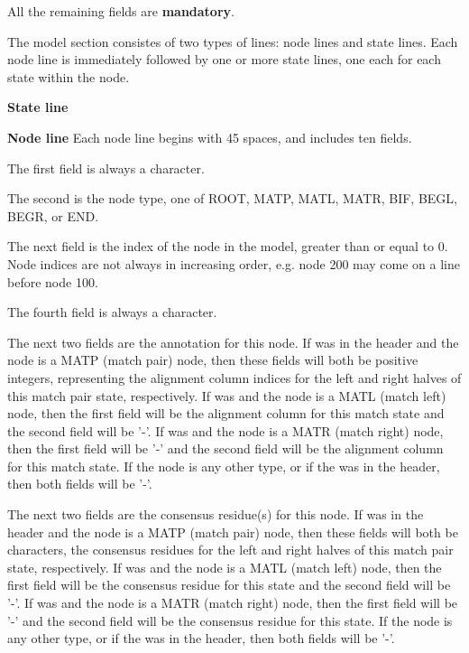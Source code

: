 All the remaining fields are \textbf{mandatory}.

The model section consistes of two types of lines: node lines and
state lines. Each node line is immediately followed by one or more
state lines, one each for each state within the node. 

\begin{sreitems}{\textbf{State line}}

\item [\textbf{Node line}] Each node line begins with 45 spaces, and
  includes ten fields. 

  The first field is always a \prog{[} character.

  The second is the node type, one of ROOT, MATP, MATL, MATR, BIF,
  BEGL, BEGR, or END. 

  The next field is the index of the node in the
  model, greater than or equal to 0. Node indices are not always in
  increasing order, e.g. node 200 may come on a line before node 100.

  The fourth field is always a \prog{]} character. 

  The next two fields are the  annotation for this node. If
   was  in the header and the node is a MATP
  (match pair) node, then these fields will both be positive integers,
  representing the alignment column indices for the left and right
  halves of this match pair state, respectively. If  was
   and the node is a MATL (match left) node, then the first
  field will be the alignment column for this match state and the
  second field will be '-'. If  was
   and the node is a MATR (match right) node, then the first
  field will be '-' and the second field will be the alignment column
  for this match state. If the node is any other type, or if the
   was  in the header, then both fields will be '-'.

  The next two fields are the  consensus residue(s) for
  this node. If  was  in the header and the node
  is a MATP (match pair) node, then these fields will both be
  characters, the consensus residues for the left and right halves of
  this match pair state, respectively. If  was 
  and the node is a MATL (match left) node, then the first field will
  be the consensus residue for this state and the second field will be
  '-'. If  was  and the node is a MATR (match
  right) node, then the first field will be '-' and the second field
  will be the consensus residue for this state. If the node is
  any other type, or if the  was  in the header,
  then both fields will be '-'.


\end{sreitems}
